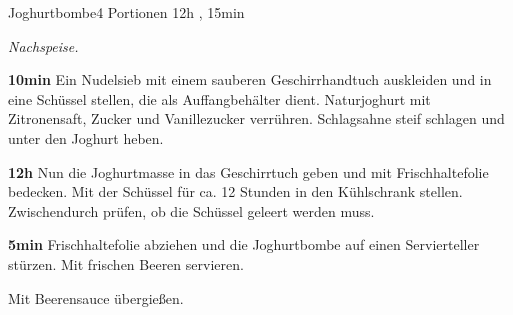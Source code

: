 \documentclass[../recipe-collections/cooking.tex]{subfiles}
\begin{document}
\begin{recipe}{Joghurtbombe}{4 Portionen }{12h , 15min }

  \freeform{}\textit{Nachspeise.}


  \textbf{10min}
  Ein Nudelsieb mit einem sauberen Geschirrhandtuch auskleiden und in eine Schüssel stellen, die als Auffangbehälter dient.
  Naturjoghurt mit Zitronensaft, Zucker und Vanillezucker verrühren.
  Schlagsahne steif schlagen und unter den Joghurt heben.

  \newstep{}\textbf{12h}
  Nun die Joghurtmasse in das Geschirrtuch geben und mit Frischhaltefolie bedecken.
  Mit der Schüssel für ca. 12 Stunden in den Kühlschrank stellen.
  Zwischendurch prüfen, ob die Schüssel geleert werden muss.


  \textbf{5min}
  Frischhaltefolie abziehen und die Joghurtbombe auf einen Servierteller stürzen.
  Mit frischen Beeren servieren.

  \freeform{}\hrulefill{}

  \freeform{}
  Mit Beerensauce übergießen.

\end{recipe}
\end{document}
